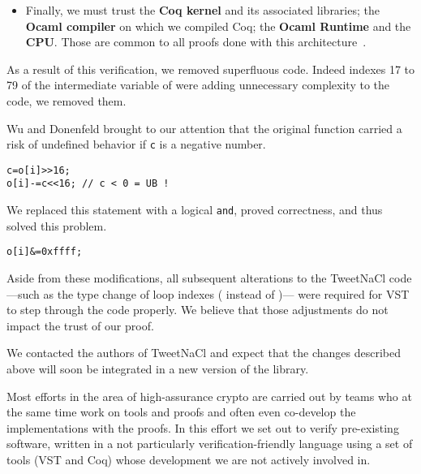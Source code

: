 \begin{itemize}
      \item Finally, we must trust the \textbf{Coq kernel} and its
            associated libraries; the \textbf{Ocaml compiler} on which we compiled Coq;
            the \textbf{Ocaml Runtime} and the \textbf{CPU}. Those are common to all proofs
            done with this architecture~\cite{2015-Appel,coq-faq}.
\end{itemize}

As a result of this verification, we removed superfluous code.
Indeed indexes 17 to 79 of the  intermediate variable of
 were adding unnecessary complexity to the code,
we removed them.

Wu and Donenfeld brought to our attention that the original
 function carried a risk of undefined behavior if \texttt{c}
is a negative number.
\begin{lstlisting}[language=Ctweetnacl,stepnumber=0]
c=o[i]>>16;
o[i]-=c<<16; // c < 0 = UB !
\end{lstlisting}
We replaced this statement with a logical \texttt{and}, proved correctness,
and thus solved this problem.
\begin{lstlisting}[language=Ctweetnacl,stepnumber=0]
o[i]&=0xffff;
\end{lstlisting}

Aside from these modifications, all subsequent alterations to the TweetNaCl code%
---such as the type change of loop indexes ( instead of )---%
were required for VST to step through the code properly. We believe that those
adjustments do not impact the trust of our proof.

We contacted the authors of TweetNaCl and expect that the changes described
above will soon be integrated in a new version of the library.




Most efforts in the area of high-assurance crypto are carried out
by teams who at the same time work on tools and proofs and often
even co-develop the implementations with the proofs.
In this effort we set out to verify pre-existing software,
written in a not particularly verification-friendly language
using a set of tools (VST and Coq) whose development we are not
actively involved in.

